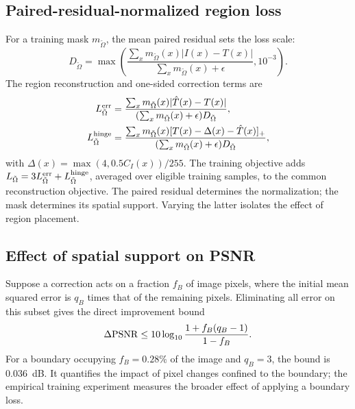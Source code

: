 \subsection{Paired-residual-normalized region loss}

For a training mask $m_{\tilde\Omega}$, the mean paired
residual sets the loss scale:
\begin{equation}
D_{\tilde\Omega}=
\max\left(
\frac{\sum_xm_{\tilde\Omega}(x)|I(x)-T(x)|}
     {\sum_xm_{\tilde\Omega}(x)+\epsilon},
10^{-3}\right).
\end{equation}
The region reconstruction and one-sided correction terms are
\begin{equation}
\begin{aligned}
L^{\rm err}_{\tilde\Omega}
&=
\frac{\sum_xm_{\tilde\Omega}(x)|\hat T(x)-T(x)|}
     {(\sum_xm_{\tilde\Omega}(x)+\epsilon)D_{\tilde\Omega}},\\
L^{\rm hinge}_{\tilde\Omega}
&=
\frac{\sum_xm_{\tilde\Omega}(x)
       [T(x)-\Delta(x)-\hat T(x)]_+}
     {(\sum_xm_{\tilde\Omega}(x)+\epsilon)D_{\tilde\Omega}},
\end{aligned}
\label{eq:region-loss}
\end{equation}
with $\Delta(x)=\max(4,0.5C_I(x))/255$.
The training objective adds
$L_{\tilde\Omega}=3L^{\rm err}_{\tilde\Omega}
+L^{\rm hinge}_{\tilde\Omega}$, averaged over eligible
training samples, to the common reconstruction objective.
The paired residual determines the normalization; the mask
determines its spatial support. Varying the latter isolates
the effect of region placement.

\subsection{Effect of spatial support on PSNR}

Suppose a correction acts on a fraction $f_B$ of image
pixels, where the initial mean squared error is $q_B$
times that of the remaining pixels. Eliminating all error
on this subset gives the direct improvement bound
\begin{equation}
\Delta{\rm PSNR}\leq
10\log_{10}
\frac{1+f_B(q_B-1)}{1-f_B}.
\label{eq:bound}
\end{equation}
For a boundary occupying $f_B=0.28\%$ of the image
and $q_B=3$, the bound is $0.036$~dB. It quantifies
the impact of pixel changes confined to the boundary;
the empirical training experiment measures the broader
effect of applying a boundary loss.
